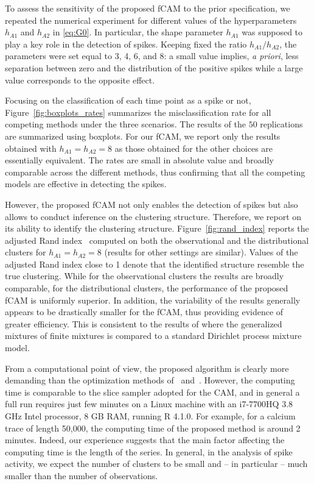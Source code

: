 To assess the sensitivity of the proposed fCAM to the prior specification, we repeated the numerical experiment for different values of the hyperparameters $h_{A1}$ and $h_{A2}$ in \eqref{eq:G0}. In particular, the shape parameter $h_{A1}$ was supposed to play a key role in the detection of spikes. Keeping fixed the ratio $h_{A1}/h_{A2}$, the parameters were set equal to 3, 4, 6, and 8: a small value implies, \textit{a priori}, less separation between zero and the distribution of the positive spikes while a large value corresponds to the opposite effect. 


Focusing on the classification of each time point as a spike or not, Figure~\ref{fig:boxplots_rates} summarizes the misclassification rate for all competing methods under the three scenarios. The results of the $50$ replications are summarized using boxplots. For our fCAM, we report only the results obtained with $h_{A1} = h_{A2} = 8$ as those obtained for the other choices are essentially equivalent.  The rates are small in absolute value and broadly comparable across the different methods, thus confirming that all the competing models are effective in detecting the spikes.  

However, the proposed fCAM not only enables the detection of spikes but also allows to conduct inference on the clustering structure. Therefore, we report on its ability to identify the clustering structure. Figure~\ref{fig:rand_index} reports the adjusted Rand index~\citep{rand1971,hubert1985} computed on both the observational and the distributional clusters for $h_{A1} = h_{A2} = 8$ (results for other settings are similar). Values of the adjusted Rand index close to 1 denote that the identified structure resemble the true clustering. While for the observational clusters the results are broadly comparable, for the distributional clusters, the performance of the proposed fCAM is uniformly superior. In addition, the variability of the results generally appears to be drastically smaller for the fCAM, thus providing evidence of greater efficiency. This is consistent to the results of \citet{fruhwirthschnatter2020} where  the generalized mixtures of finite mixtures is compared to a standard Dirichlet process mixture model. 

From a computational point of view, the proposed algorithm is clearly more demanding than the optimization methods of~\citet{jewell2019} and~\citet{friedrich2017}.  However, the computing time is comparable to the slice sampler adopted for the CAM, and in general a full run requires just few minutes on a Linux machine with an i7-7700HQ 3.8 GHz Intel processor, 8 GB RAM, running R 4.1.0. For example, for a calcium trace of length 50,000, the computing time of the proposed method is around 2 minutes. Indeed, our experience suggests that the main factor affecting the computing time is the length of the series.  In general, in the analysis of spike activity, we expect the number of clusters  to be small and -- in particular -- much smaller than the number of observations.


